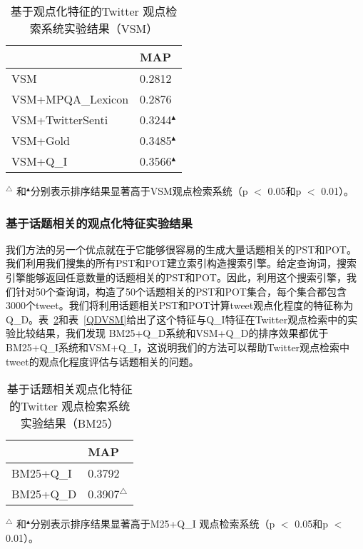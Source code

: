 \begin{table}
 \centering
    \caption{基于观点化特征的Twitter 观点检索系统实验结果（VSM）}
    \label{opinionatednessVSM}
 \begin{tabular}{|l l|}
 \hline
 & MAP \\
 \hline
 VSM &0.2812\\
 \hline
VSM+MPQA\_Lexicon&0.2876\\
VSM+TwitterSenti &0.3244$^\blacktriangle$\\
VSM+Gold&0.3485$^\blacktriangle$\\
VSM+Q\_I&0.3566$^\blacktriangle$\\
 \hline
 \end{tabular}
     \begin{tablenotes}
        \footnotesize
\item $^\triangle$ 和$^\blacktriangle$分别表示排序结果显著高于VSM观点检索系统（p $<$ 0.05和p $<$ 0.01）。
\end{tablenotes}
\end{table}


\subsubsection{基于话题相关的观点化特征实验结果}
\label{TDPPFE}
我们方法的另一个优点就在于它能够很容易的生成大量话题相关的PST和POT。我们利用我们搜集的所有PST和POT建立索引构造搜索引擎。给定查询词，搜索引擎能够返回任意数量的话题相关的PST和POT。因此，利用这个搜索引擎，我们针对50个查询词，构造了50个话题相关的PST和POT集合，每个集合都包含3000个tweet。我们将利用话题相关PST和POT计算tweet观点化程度的特征称为Q\_D。表~\ref{QDBM25}和表~\ref{QDVSM}给出了这个特征与Q\_I特征在Twitter观点检索中的实验比较结果，我们发现 BM25+Q\_D系统和VSM+Q\_D的排序效果都优于BM25+Q\_I系统和VSM+Q\_I，这说明我们的方法可以帮助Twitter观点检索中tweet的观点化程度评估与话题相关的问题。

\begin{table}
    \caption{基于话题相关观点化特征的Twitter 观点检索系统实验结果（BM25）}
     \label{QDBM25}
 \centering
 \begin{tabular}{|l l|}
 \hline
 & MAP \\
 \hline
BM25+Q\_I&0.3792\\
BM25+Q\_D&0.3907$^\triangle$\\
 \hline
 \end{tabular}
      \begin{tablenotes}
        \footnotesize
\item $^\triangle$ 和$^\blacktriangle$分别表示排序结果显著高于M25+Q\_I 观点检索系统（p $<$ 0.05和p $<$ 0.01）。
\end{tablenotes}
 \end{table}

